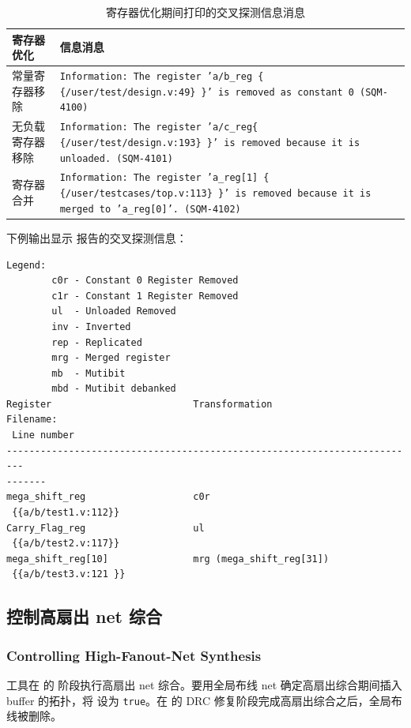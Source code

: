\begin{table}[htbp]
\centering
\caption{寄存器优化期间打印的交叉探测信息消息}
\label{tab:cross-probe-msg}
\small
\begin{tabularx}{\textwidth}{@{}l X@{}}
\toprule
\textbf{寄存器优化} & \textbf{信息消息} \\
\midrule
常量寄存器移除
  & \texttt{Information: The register 'a/b\_reg \{ \{/user/test/design.v:49\} \}' is removed as constant 0 (SQM-4100)} \\
无负载寄存器移除
  & \texttt{Information: The register 'a/c\_reg\{ \{/user/test/design.v:193\} \}' is removed because it is unloaded. (SQM-4101)} \\
寄存器合并
  & \texttt{Information: The register 'a\_reg[1] \{ \{/user/testcases/top.v:113\} \}' is removed because it is merged to 'a\_reg[0]'. (SQM-4102)} \\
\bottomrule
\end{tabularx}
\end{table}

下例输出显示  报告的交叉探测信息：
\begin{lstlisting}
Legend:
        c0r - Constant 0 Register Removed
        c1r - Constant 1 Register Removed
        ul  - Unloaded Removed
        inv - Inverted
        rep - Replicated
        mrg - Merged register
        mb  - Mutibit
        mbd - Mutibit debanked
Register                         Transformation                 Filename:
 Line number
-------------------------------------------------------------------------
-------
mega_shift_reg                   c0r
 {{a/b/test1.v:112}}
Carry_Flag_reg                   ul
 {{a/b/test2.v:117}}
mega_shift_reg[10]               mrg (mega_shift_reg[31])
 {{a/b/test3.v:121 }}
\end{lstlisting}

\subsection{控制高扇出 net 综合}
\subsubsection*{Controlling High-Fanout-Net Synthesis}

工具在  的  阶段执行高扇出 net 综合。要用全局布线 net 确定高扇出综合期间插入 buffer 的拓扑，将  设为 \texttt{true}。在  的 DRC 修复阶段完成高扇出综合之后，全局布线被删除。

